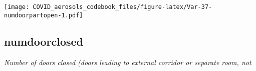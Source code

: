 \documentclass[]{article}
\begin{document}
\begin{minipage}{0.25 \textwidth}

\texttt{[image: COVID\_aerosols\_codebook\_files/figure-latex/Var-37-numdoorpartopen-1.pdf]}

\end{minipage}

\noindent\makebox[\linewidth]{\rule{\textwidth}{0.4pt}}

\hypertarget{numdoorclosed}{%
\subsection{numdoorclosed}\label{numdoorclosed}}

\emph{Number of doors closed (doors leading to external corridor or
separate room, not}

\begin{minipage}{0.75 \textwidth}


\end{minipage}
\end{document}
